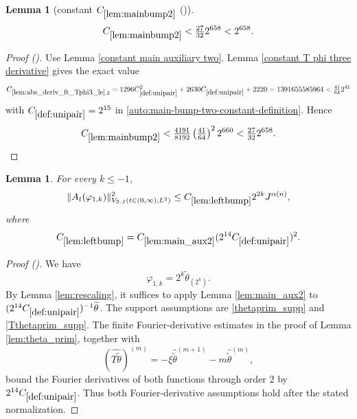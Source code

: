\documentclass[12pt,reqno]{amsart}
\newcommand{\auto}{{({\tiny\faCar})}}
\theoremstyle{plain}
\newtheorem{lemma}[theorem]{Lemma}
\numberwithin{equation}{section}
\theoremstyle{remark}
\newcommand{\uses}[1]{}
\newcommand{\usesdefs}[1]{}
\begin{document}
\begin{lemma}[constant $C_{\ref{lem:mainbump2}}$ \auto]\label{constant main bump two}\uses{constant main auxiliary two,lem:abs_deriv_ft_Tphi3_le,constant T phi three derivative,lem:mainbump2}\usesdefs{def:unipair}
\begin{equation}\label{constant main bump two bound}
C_{\ref{lem:mainbump2}}<\tfrac{27}{32}2^{658}<2^{658}.
\end{equation}
\end{lemma}
\begin{proof}[Proof \auto]
Use Lemma \ref{constant main auxiliary two}. Lemma \ref{constant T phi three derivative} gives the exact value
\[
C_{\ref{lem:abs_deriv_ft_Tphi3_le},2}
=1296C_{\ref{def:unipair}}^2+2630C_{\ref{def:unipair}}+2220
=1391655585964
<\tfrac{41}{64}2^{41}
\]
with $C_{\ref{def:unipair}}=2^{15}$ in \eqref{auto:main-bump-two-constant-definition}. Hence
\[
C_{\ref{lem:mainbump2}}
<\tfrac{4191}{8192}\left(\tfrac{41}{64}\right)^2 2^{660}
<\tfrac{27}{32}2^{658}.
\]
\end{proof}

\begin{lemma}\label{lem:leftbump}\uses{lem:rescaling,lem:main_aux2,lem:theta_prim}\usesdefs{A_def,def:unipair,defn:window based bump functions}
For every $k\le-1$,
\begin{equation}\label{leftbump}
\|A_t(\varphi_{1,k})\|_{V_{2,J}(t\in(0,\infty);L^2)}^2
\le C_{\ref{lem:leftbump}}2^{2k}J^{\alpha(n)},
\end{equation}
where
\begin{equation}\label{auto:left-bump-constant-definition}
C_{\ref{lem:leftbump}}
=C_{\ref{lem:main_aux2}}(2^{14}C_{\ref{def:unipair}})^2.
\end{equation}
\end{lemma}

\begin{proof}[Proof \auto]
We have
\[
\varphi_{1,k}=2^k\widetilde\theta_{(2^k)}.
\]
By Lemma \ref{lem:rescaling}, it suffices to apply Lemma \ref{lem:main_aux2} to $(2^{14}C_{\ref{def:unipair}})^{-1}\widetilde\theta$. The support assumptions are \eqref{thetaprim_supp} and \eqref{Tthetaprim_supp}. The finite Fourier-derivative estimates in the proof of Lemma \ref{lem:theta_prim}, together with
\[
(\widehat{T\widetilde\theta})^{(m)}
=-\xi\widehat{\widetilde\theta}^{(m+1)}
-m\widehat{\widetilde\theta}^{(m)},
\]
bound the Fourier derivatives of both functions through order $2$ by $2^{14}C_{\ref{def:unipair}}$. Thus both Fourier-derivative assumptions hold after the stated normalization.
\end{proof}
\end{document}
